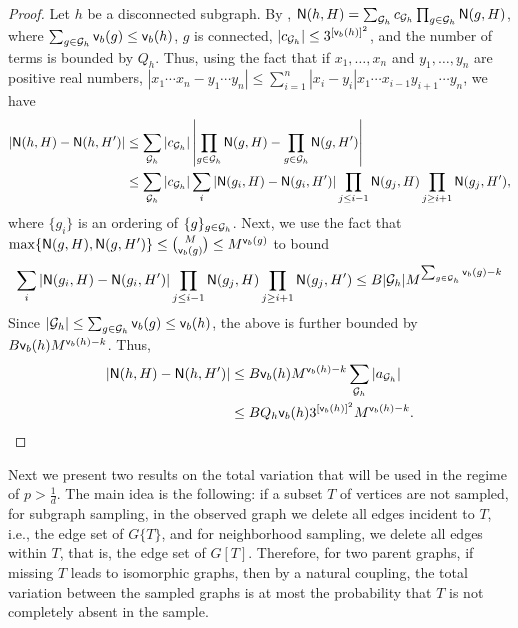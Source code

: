 \begin{proof}
Let $ h $ be a disconnected subgraph. By , $ {\mathsf{N}}(h, H) = \sum_{{\mathcal{G}}_h} c_{{\mathcal{G}}_h}\prod_{g\in{\mathcal{G}}_h}{\mathsf{N}}(g, H) $, where $ \sum_{g\in{\mathcal{G}}_h}{\mathsf{v}}_b(g) \leq {\mathsf{v}}_{b}(h) $, $ g $ is connected,  $ |c_{{\mathcal{G}}_h}| \leq 3^{[{\mathsf{v}}_{b}(h)]^2} $, and the number of terms is bounded by $ Q_h $. Thus, using the fact that if $ x_1, \dots, x_n $ and $ y_1, \dots, y_n $ are positive real numbers, $ |x_1\cdots x_n - y_1\cdots y_n| \leq \sum_{i=1}^n|x_i - y_i |x_1\cdots x_{i-1}y_{i+1}\cdots y_n $, we have
\begin{align*}
|{\mathsf{N}}(h, H)-{\mathsf{N}}(h, H')|
& \leq \sum_{{\mathcal{G}}_h}|c_{{\mathcal{G}}_h}|\left|\prod_{g\in{\mathcal{G}}_h}{\mathsf{N}}(g, H)-\prod_{g\in{\mathcal{G}}_h}{\mathsf{N}}(g, H')\right| \\
& \leq \sum_{{\mathcal{G}}_h}|c_{{\mathcal{G}}_h}|\sum_{i}|{\mathsf{N}}(g_i, H)-{\mathsf{N}}(g_i, H')|\prod_{j\leq i-1}{\mathsf{N}}(g_j, H) \prod_{j\geq i+1}{\mathsf{N}}(g_j, H'),
\end{align*}
where $ \{ g_i \} $ is an ordering of $ \{ g \}_{g\in{\mathcal{G}}_h} $. Next, we use the fact that $ \max\{{\mathsf{N}}(g, H), {\mathsf{N}}(g, H') \} \leq \binom{M}{{\mathsf{v}}_b(g)} \leq M^{{\mathsf{v}}_b(g)} $ to bound
\begin{equation*}
\sum_{i}|{\mathsf{N}}(g_i, H)-{\mathsf{N}}(g_i, H')|\prod_{j\leq i-1}{\mathsf{N}}(g_j, H) \prod_{j\geq i+1}{\mathsf{N}}(g_j, H') \leq B|{\mathcal{G}}_h| M^{\sum_{g\in{\mathcal{G}}_h} {\mathsf{v}}_b(g)-k}
\end{equation*}
Since $ |{\mathcal{G}}_h| \leq \sum_{g\in{\mathcal{G}}_h}{\mathsf{v}}_b(g) \leq {\mathsf{v}}_{b}(h) $, the above is further bounded by $ B{\mathsf{v}}_{b}(h)M^{{\mathsf{v}}_{b}(h)-k} $. Thus,
\begin{align*}
|{\mathsf{N}}(h, H)-{\mathsf{N}}(h, H')| & \leq B{\mathsf{v}}_{b}(h)M^{{\mathsf{v}}_{b}(h)-k}\sum_{{\mathcal{G}}_h}|a_{{\mathcal{G}}_h}| \\
& \leq BQ_h{\mathsf{v}}_{b}(h)3^{[{\mathsf{v}}_{b}(h)]^2}M^{{\mathsf{v}}_{b}(h)-k}.
\end{align*}
\end{proof}

Next we present two results on the total variation that will be used in the regime of $p>\frac{1}{d}$.
The main idea is the following: if a subset $T$ of vertices are not sampled, for subgraph sampling, in the observed graph we delete all edges incident to $T$, i.e., the edge set of $G\{T\}$, and for neighborhood sampling, we delete all edges within $T$, that is, the edge set of $G[T]$. Therefore, for two parent graphs, if missing $T$ leads to isomorphic graphs, then by a natural coupling, the total variation between the sampled graphs is at most the probability that $T$ is not completely absent in the sample.

